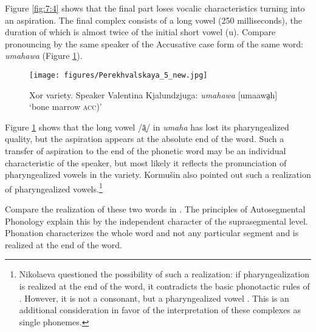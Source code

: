 \documentclass[output=paper,colorlinks,citecolor=brown]{langscibook}
\begin{document}
Figure \ref{fig:7:4} shows that the final part loses vocalic characteristics turning into an aspiration. The final complex consists of a long vowel (250 milliseconds), the duration of which is almost twice of the initial short vowel (u). Compare pronouncing by the same speaker of the Accusative case form of the same word: \textit{umahawa} (Figure \ref{fig:7:5}). 


\begin{figure}
\texttt{[image: figures/Perekhvalskaya\_5\_new.jpg]}
\caption{Xor variety. Speaker Valentina Kjalundzjuga: \textit{umahawa} [umaawa{̤}h] ‘bone marrow \textsc{acc})’}
\label{fig:7:5}
\end{figure}

Figure \ref{fig:7:5} shows that the long vowel /ā{̤}/ in \textit{umaha} has lost its pharyngealized quality, but the aspiration appears at the absolute end of the word. Such a transfer of aspiration to the end of the phonetic word may be an individual characteristic of the speaker, but most likely it reflects the pronunciation of pharyngealized vowels in the  variety. Kormušin also pointed out such a realization of pharyngealized vowels.\footnote{Nikolaeva questioned the possibility of such a realization: if pharyngealization is realized at the end of the word, it contradicts the basic phonotactic rules of . However, it is not a consonant, but a pharyngealized vowel \citep{Nikolaeva2000}. This is an additional consideration in favor of the interpretation of these complexes as single phonemes.}

Compare the realization of these two words in . The principles of Autosegmental Phonology \citep{Goldsmith1976} explain this by the independent character of the suprasegmental level. Phonation characterizes the whole word and not any particular segment and is realized at the end of the word. 

\end{document}
